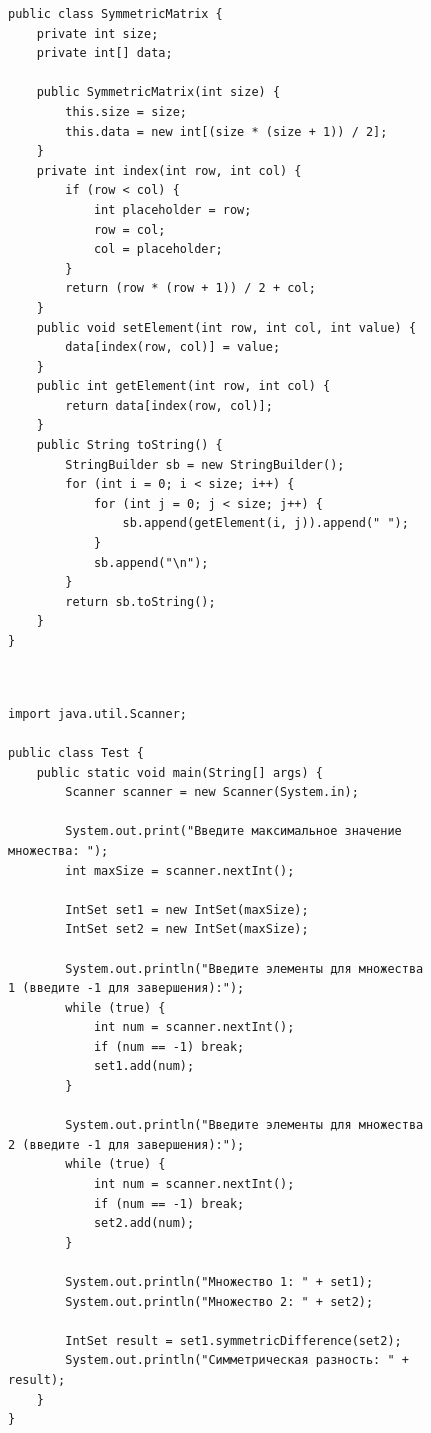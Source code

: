 \documentclass[a4paper, 14pt]{extarticle}
\begin{document}
\newpage
\begin{figure}[!htb]
\begin{lstlisting}[language={},caption={Основной класс для варианта 1 (SymmetricMatrix)},label={lst:code2}]
public class SymmetricMatrix {
    private int size;
    private int[] data;

    public SymmetricMatrix(int size) {
        this.size = size;
        this.data = new int[(size * (size + 1)) / 2];
    }
    private int index(int row, int col) {
        if (row < col) {
            int placeholder = row;
            row = col;
            col = placeholder;
        }
        return (row * (row + 1)) / 2 + col;
    }
    public void setElement(int row, int col, int value) {
        data[index(row, col)] = value;
    }
    public int getElement(int row, int col) {
        return data[index(row, col)];
    }
    public String toString() {
        StringBuilder sb = new StringBuilder();
        for (int i = 0; i < size; i++) {
            for (int j = 0; j < size; j++) {
                sb.append(getElement(i, j)).append(" ");
            }
            sb.append("\n");
        }
        return sb.toString();
    }
}



\end{lstlisting}
\end{figure}
\newpage
\begin{figure}[!htb]
\begin{lstlisting}[language={},caption={Тестовый класс для варинта 21 (с консольным интерфейсом},label={lst:code3}]
import java.util.Scanner;

public class Test {
    public static void main(String[] args) {
        Scanner scanner = new Scanner(System.in);

        System.out.print("Введите максимальное значение множества: ");
        int maxSize = scanner.nextInt();

        IntSet set1 = new IntSet(maxSize);
        IntSet set2 = new IntSet(maxSize);

        System.out.println("Введите элементы для множества 1 (введите -1 для завершения):");
        while (true) {
            int num = scanner.nextInt();
            if (num == -1) break;
            set1.add(num);
        }

        System.out.println("Введите элементы для множества 2 (введите -1 для завершения):");
        while (true) {
            int num = scanner.nextInt();
            if (num == -1) break;
            set2.add(num);
        }

        System.out.println("Множество 1: " + set1);
        System.out.println("Множество 2: " + set2);

        IntSet result = set1.symmetricDifference(set2);
        System.out.println("Симметрическая разность: " + result);
    }
}


\end{lstlisting}
\end{figure}
\end{document}

